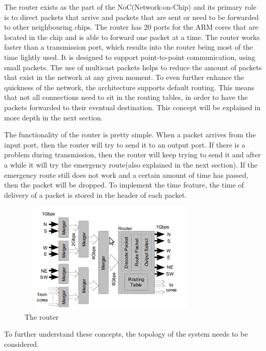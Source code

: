 \documentclass[12pt,twosided]{article}
\begin{document}
The router exists as the part of the NoC(Network-on-Chip) and its primary role is to direct packets that arrive and packets that are sent or need to be forwarded to other neighbouring chips. The router has 20 ports for the ARM cores that are located in the chip and is able to forward one packet at a time. The router works faster than a transmission port, which results into the router being most of the time lightly used. It is designed to support point-to-point communication, using small packets. The use of multicast packets helps to reduce the amount of packets that exist in the network at any given moment. To even further enhance the quickness of the network, the architecture supports default routing. This means that not all connections need to sit in the routing tables, in order to have the packets forwarded to their eventual destination. This concept will be explained in more depth in the next section.

The functionality of the router is pretty simple. When a packet arrives from the input port, then the router will try to send it to an output port. If there is a problem during transmission, then the router will keep trying to send it and after a while it will try the emergency route(also explained in the next section). If the emergency route still does not work and a certain amount of time has passed, then the packet will be dropped. To implement the time feature, the time of delivery of a packet is stored in the header of each packet.

\begin{figure}[h!]
\includegraphics[width=250pt,height=150pt,scale=2]{Pics/router.png}
\centering
\caption{The router\cite{navaridas2009understanding}}
\end{figure}
To further understand these concepts, the topology of the system needs to be considered.
\end{document}
